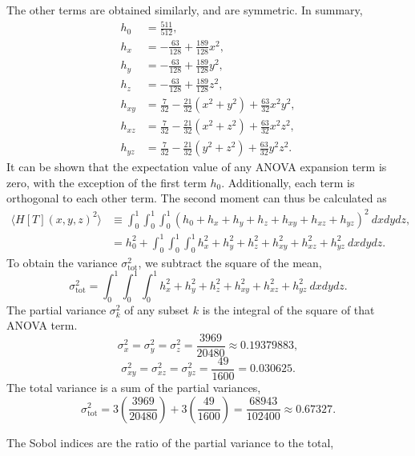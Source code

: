 The other terms are obtained similarly, and are symmetric.  In summary,
\begin{align}
  h_0 &= \frac{511}{512}, \\
  h_x &= -\frac{63}{128} + \frac{189}{128}x^2, \\
  h_y &= -\frac{63}{128} + \frac{189}{128}y^2, \\
  h_z &= -\frac{63}{128} + \frac{189}{128}z^2, \\
  h_{xy} &= \frac{7}{32} - \frac{21}{32}(x^2+y^2) + \frac{63}{32}x^2y^2, \\
  h_{xz} &= \frac{7}{32} - \frac{21}{32}(x^2+z^2) + \frac{63}{32}x^2z^2, \\
  h_{yz} &= \frac{7}{32} - \frac{21}{32}(y^2+z^2) + \frac{63}{32}y^2z^2.
\end{align}
It can be shown that the expectation value of any ANOVA expansion term is zero, with the exception of the
first term $h_0$.  Additionally, each term is orthogonal to each other term.  The second moment can thus be
calculated as
\begin{align}
  \langle H[T](x,y,z)^2\rangle &\equiv \int_0^1\int_0^1\int_0^1 (h_0+h_x+h_y+h_z+h_{xy}+h_{xz}+h_{yz})^2\
  dxdydz, \nonumber\\
  &= h_0^2+\int_0^1\int_0^1\int_0^1 h_x^2+h_y^2+h_z^2+h_{xy}^2+h_{xz}^2+h_{yz}^2\ dxdydz.
\end{align}
To obtain the variance $\sigma_\text{tot}^2$, we subtract the square of the mean,
\begin{equation}
  \sigma_\text{tot}^2 = \int_0^1\int_0^1\int_0^1 h_x^2+h_y^2+h_z^2+h_{xy}^2+h_{xz}^2+h_{yz}^2\ dxdydz.
\end{equation}
The partial variance $\sigma_k^2$ of any subset $k$ is the integral of the square of that ANOVA term.
\begin{equation}
  \sigma_x^2 = \sigma_y^2 = \sigma_z^2 = \frac{3969}{20480} \approx0.19379883,
\end{equation}
\begin{equation}
  \sigma_{xy}^2 = \sigma_{xz}^2 = \sigma_{yz}^2 = \frac{49}{1600} =0.030625.
\end{equation}
The total variance is a sum of the partial variances,
\begin{equation}
  \sigma_\text{tot}^2 = 3\left(\frac{3969}{20480}\right) + 3\left(\frac{49}{1600}\right) =
  \frac{68943}{102400} \approx 0.67327.
\end{equation}

The Sobol indices are the ratio of the partial variance to the total,

